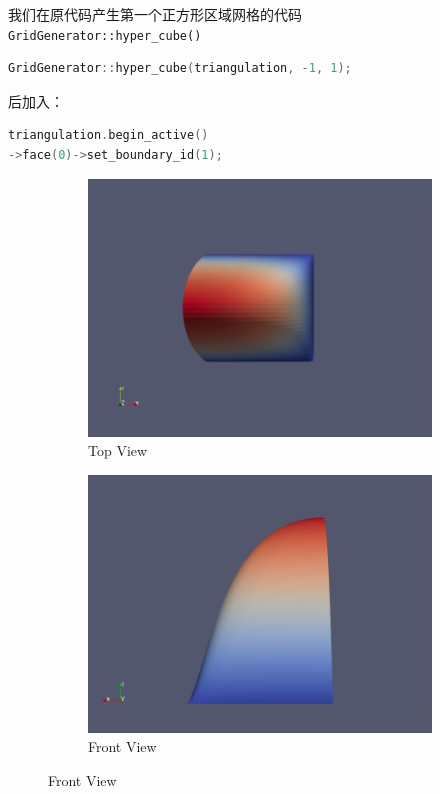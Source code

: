 \documentclass[12pt, a4paper]{article}
\numberwithin{equation}{section} %
\begin{document}
我们在原代码产生第一个正方形区域网格的代码\\
\verb|GridGenerator::hyper_cube()|
\begin{lstlisting}[language=c]
GridGenerator::hyper_cube(triangulation, -1, 1);
\end{lstlisting}
后加入：
\begin{lstlisting}[language=c]
triangulation.begin_active()
->face(0)->set_boundary_id(1);
\end{lstlisting}
\begin{figure}[htbp]
    \centering
    \begin{subfigure}{0.48\textwidth}
        \centering
        \includegraphics[width=\textwidth]{proj5.png}
        \caption{Top View}
        \label{fig2:front_view}
    \end{subfigure}
    \hfill
    \begin{subfigure}{0.48\textwidth}
        \centering
        \includegraphics[width=\textwidth]{proj6.png}
        \caption{Front View}
        \label{fig2:top_view}
    \end{subfigure}
    

\end{figure}
\end{document}
